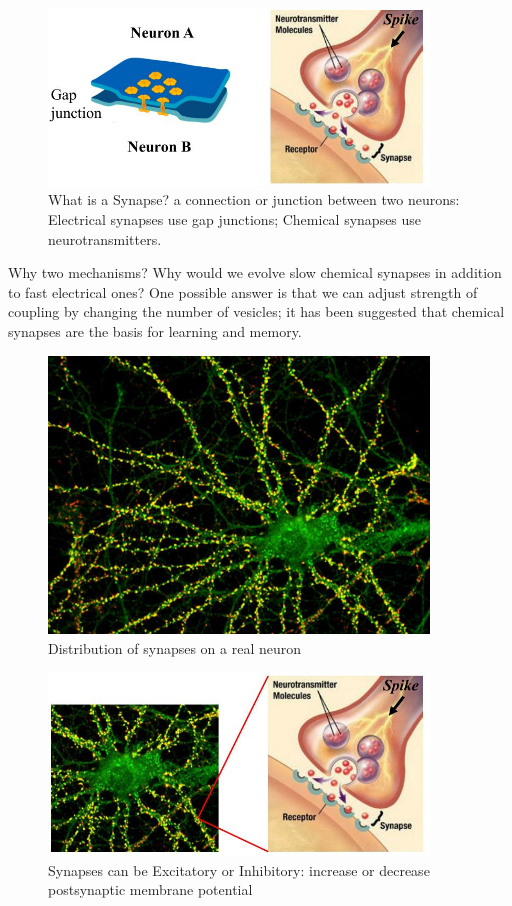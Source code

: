 \documentclass[]{article}
\begin{document}
\begin{figure}[H]
	\caption[What is a Synapse?]{What is a Synapse?  a connection or junction between two neurons: Electrical synapses use gap junctions;	Chemical synapses use neurotransmitters.}
	\includegraphics[width=0.9\textwidth]{synapse1}
\end{figure}

Why two mechanisms? Why would we evolve slow chemical synapses in addition to fast electrical ones? One possible answer is that we can adjust strength of coupling by changing the number of vesicles; it has been suggested that chemical synapses are the basis for learning and memory.
\begin{figure}[H]
	\caption[Distribution of synapses on a real neuron]{Distribution of synapses on a real neuron}
	\includegraphics[width=0.9\textwidth]{synapse2}
\end{figure}

\begin{figure}[H]
	\caption[Synapses can be Excitatory or Inhibitory]{Synapses can be Excitatory or Inhibitory: increase or decrease postsynaptic membrane potential}
	\includegraphics[width=0.9\textwidth]{synapse3}
\end{figure}
\end{document}
